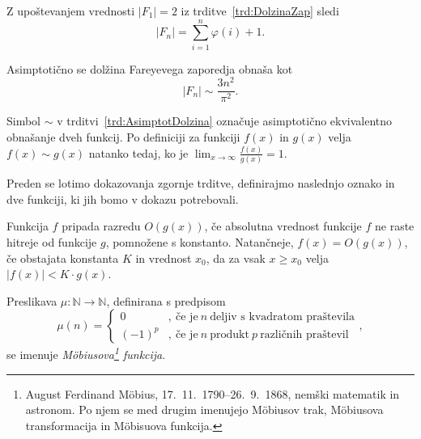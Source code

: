 \documentclass[mat1]{fmfdelo}
\begin{document}
\begin{opomba}
\label{op:AsimptotDolzina}
Z upoštevanjem vrednosti $|F_{1}| = 2$ iz trditve~\ref{trd:DolzinaZap} sledi \[  |F_{n}| = \sum_{i=1}^n \varphi(i) + 1. \]
\end{opomba}

\begin{trditev}
\label{trd:AsimptotDolzina}
Asimptotično se dolžina Fareyevega zaporedja obnaša kot
\begin{equation}
|F_{n}|\sim\frac{3n^2}{\pi^2}.
\end{equation}
\end{trditev}

\begin{opomba}
Simbol $\sim$ v trditvi~\ref{trd:AsimptotDolzina} označuje asimptotično ekvivalentno obnašanje dveh funkcij.
Po definiciji za funkciji $f(x)$ in $g(x)$ velja $f(x) \sim g(x)$ natanko tedaj, ko je $ \lim_{x \to \infty} \frac{f(x)}{g(x)} = 1$.
\end{opomba}

%
Preden se lotimo dokazovanja zgornje trditve, definirajmo naslednjo oznako in dve funkciji, ki jih bomo v dokazu potrebovali.

\begin{definicija}
Funkcija $f$ pripada razredu $O \left(g(x) \right)$, če absolutna vrednost funkcije $f$ ne raste hitreje od funkcije $g$, pomnožene s konstanto.
Natančneje, $f(x) = O \left(g(x) \right)$, če obstajata konstanta $K$ in vrednost $x_{0}$, da za vsak $x \geq x_{0}$ velja $|f(x)| < K \cdot g(x)$.
\end{definicija}

\begin{definicija}
\label{def:MobFun}
Preslikava \( \mu\colon \mathbb{N} \to \mathbb{N} \), definirana s predpisom
\begin{equation}
\mu(n) = \left\{
\begin{array}{rl}
0 &,\ \textrm{če je}\ n\ \textrm{deljiv s kvadratom praštevila}\\
(-1)^p &,\ \textrm{če je}\ n\ \textrm{produkt}\ p\ \textrm{različnih praštevil}
\end{array},
\right.
\end{equation}
se imenuje \emph{M\"obiusova\footnote{August Ferdinand M\"obius, 17.\ 11.\ 1790--26.\ 9.\ 1868, nemški matematik in astronom. Po njem se med drugim imenujejo M\"obiusov trak, M\"obiusova transformacija in M\"obisuova funkcija.} funkcija}.
\end{definicija}
\end{document}
